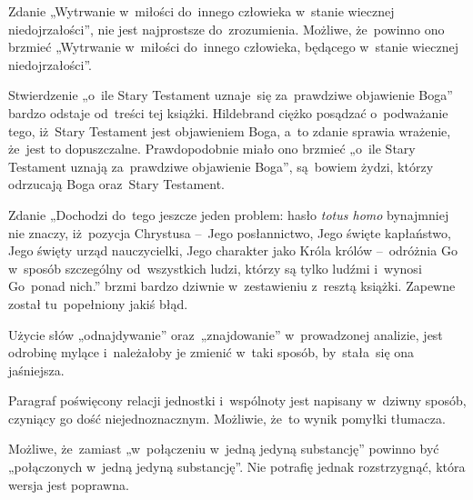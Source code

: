 \documentclass[a4paper,11pt]{article}
\begin{document}



\start {} Zdanie „Wytrwanie w~miłości do~innego człowieka
w~stanie wiecznej niedojrzałości”, nie jest najprostsze
do~zrozumienia. Możliwe, że~powinno ono brzmieć „Wytrwanie w~miłości
do~innego człowieka, będącego w~stanie wiecznej niedojrzałości”.

\vspace{\spaceFour}


\start {} Stwierdzenie „o~ile Stary Testament uznaje~się
za~prawdziwe objawienie Boga” bardzo odstaje od~treści tej książki.
Hildebrand ciężko posądzać o~podważanie tego, iż~Stary Testament jest
objawieniem Boga, a~to zdanie sprawia wrażenie, że~jest to
dopuszczalne. Prawdopodobnie miało ono brzmieć „o~ile Stary Testament
uznają za~prawdziwe objawienie Boga”, są~bowiem żydzi, którzy
odrzucają Boga oraz~Stary Testament.

\vspace{\spaceFour}


\start {} Zdanie „Dochodzi do~tego jeszcze jeden problem:
hasło \emph{totus homo} bynajmniej nie znaczy, iż~pozycja Chrystusa
--~Jego posłannictwo, Jego święte kapłaństwo, Jego święty urząd
nauczycielki, Jego charakter jako Króla królów --~odróżnia Go w~sposób
szczególny od~wszystkich ludzi, którzy są tylko ludźmi i~wynosi
Go~ponad nich.” brzmi bardzo dziwnie w~zestawieniu z~resztą książki.
Zapewne został tu~popełniony jakiś błąd.

\vspace{\spaceFour}


\start {} Użycie słów „odnajdywanie” oraz~„znajdowanie”
w~prowadzonej analizie, jest odrobinę mylące i~należałoby je zmienić
w~taki sposób, by~stała~się ona jaśniejsza.

\vspace{\spaceFour}


\start {} Paragraf poświęcony relacji jednostki i~wspólnoty
jest napisany w~dziwny sposób, czyniący go dość niejednoznacznym.
Możliwie, że~to wynik pomyłki tłumacza.

\vspace{\spaceFour}


\start {} Możliwe, że~zamiast „w~połączeniu w~jedną jedyną
substancję” powinno być „połączonych w~jedną jedyną substancję”.
Nie potrafię jednak rozstrzygnąć, która wersja jest poprawna.
\end{document}
